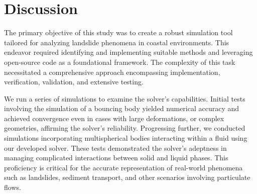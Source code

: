 \section{Discussion}


The primary objective of this study was to create a robust simulation tool tailored for analyzing landslide phenomena in coastal environments. This endeavor required identifying and implementing suitable methods and leveraging open-source code as a foundational framework. The complexity of this task necessitated a comprehensive approach encompassing implementation, verification, validation, and extensive testing.

We run a series of simulations to examine the solver's capabilities. Initial tests involving the simulation of a bouncing body yielded numerical accuracy and achieved convergence even in cases with large deformations, or complex geometries, affirming the solver's reliability. Progressing further, we conducted simulations incorporating multispherical bodies interacting within a fluid using our developed solver. These tests demonstrated the solver's adeptness in managing complicated interactions between solid and liquid phases. This proficiency is critical for the accurate representation of real-world phenomena such as landslides, sediment transport, and other scenarios involving particulate flows.

